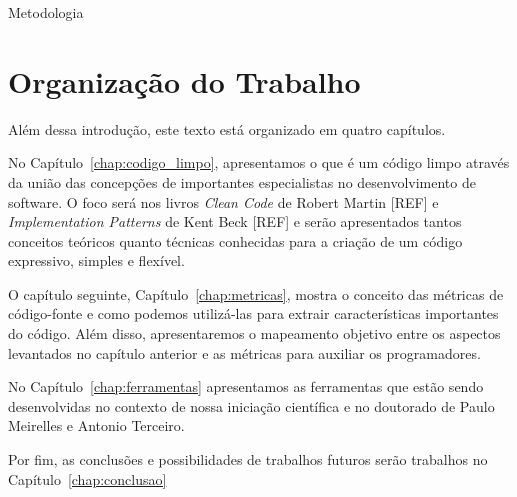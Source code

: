 Metodologia

\section{Organização do Trabalho}
\label{sec:organizacao_trabalho}

Além dessa introdução, este texto está organizado em quatro capítulos.

No Capítulo~\ref{chap:codigo_limpo}, apresentamos o que é um código limpo através
da união das concepções de importantes especialistas no desenvolvimento de software.
O foco será nos livros \textit{Clean Code} de Robert Martin [REF] e \textit{Implementation
Patterns} de Kent Beck [REF] e serão apresentados tantos conceitos teóricos
quanto técnicas conhecidas para a criação de um código expressivo, simples e flexível.

O capítulo seguinte, Capítulo~\ref{chap:metricas}, mostra o conceito das métricas de 
código-fonte e como podemos utilizá-las para extrair características importantes do
código. Além disso, apresentaremos o mapeamento objetivo entre os aspectos levantados
no capítulo anterior e as métricas para auxiliar os programadores.

No Capítulo~\ref{chap:ferramentas} apresentamos as ferramentas que estão sendo desenvolvidas
no contexto de nossa iniciação científica e no doutorado de Paulo Meirelles e Antonio Terceiro.

Por fim, as conclusões e possibilidades de trabalhos futuros serão trabalhos no Capítulo~\ref{chap:conclusao}